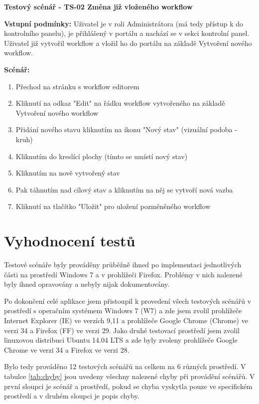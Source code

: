 \documentclass{fithesis}
\begin{document}
\begin{table}[htp]
\textbf{Testový scénář - TS-02 Změna již vloženého workflow}
 

\textbf{Vstupní podmínky:} Uživatel je v roli Administrátora (má tedy přístup k do kontrolního panelu), je přihlášený v portálu a nachází se v sekci kontrolní panel. Uživatel již vytvořil workflow a vložil ho do portálu na základě Vytvoření nového workflow.

\textbf{Scénář:}
\begin{enumerate}
\item Přechod na stránku s workflow editorem
\item Kliknutí na odkaz "Edit" na řádku workflow vytvořeného na základě Vytvoření nového workflow
\item Přidání nového stavu kliknutím na ikonu "Nový stav" (vizuální podoba - kruh)
\item Kliknutím do kreslící plochy (tímto se umístí nový stav)
\item Kliknutím na nově vytvořený stav 
\item Pak táhnutím nad cílový stav a kliknutím na něj se vytvoří nová vazba
\item Kliknutí na tlačítko "Uložit" pro uložení pozměněného workflow

\end{enumerate}
\end{table}

\section{Vyhodnocení testů}
Testové scénáře byly prováděny průběžně ihned po implementaci jednotlivých části na prostředí Windows 7 a v prohlížeči Firefox. Problémy v nich nalezené byly ihned opravovány a nebyly nijak dokumentovány.

Po dokončení celé aplikace jsem přistoupil k provedení všech testových scénářů v prostředí s  operačním systémem Windows 7 (W7) a zde jsem zvolil prohlížeče Internet Explorer (IE) ve verzích 9,11 a prohlížeče Google Chrome (Chrome) ve verzi 34 a Firefox (FF) ve verzi 29. Jako druhé testovací prostředí jsem zvolil linuxovou distribuci Ubuntu 14.04 LTS a zde byly zvoleny prohlížeče Google Chrome ve verzi 34 a Firefox ve verzi 28.

Bylo tedy prováděno 12 testových scénářů na celkem na 6 různých prostředí. V tabulce  \ref{tab:chyby} jsou uvedeny všechny nalezené chyby při provádění scénářů. V první sloupci je scénář a prostředí, pokud se chyba vyskytla pouze ve specifickém prostředí a v druhém sloupci je popis chyby.
\end{document}

